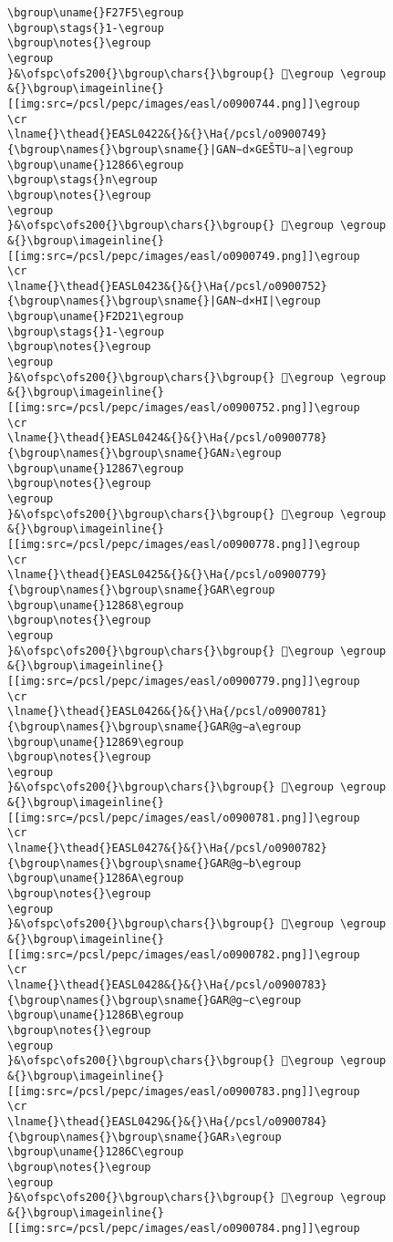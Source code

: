 \begin{verbatim}
\bgroup\uname{}F27F5\egroup
\bgroup\stags{}1-\egroup
\bgroup\notes{}\egroup
\egroup
}&\ofspc\ofs200{}\bgroup\chars{}\bgroup{} 󲟵\egroup \egroup
&{}\bgroup\imageinline{}[[img:src=/pcsl/pepc/images/easl/o0900744.png]]\egroup
\cr
\lname{}\thead{}EASL0422&{}&{}\Ha{/pcsl/o0900749}{\bgroup\names{}\bgroup\sname{}|GAN∼d×GEŠTU∼a|\egroup
\bgroup\uname{}12866\egroup
\bgroup\stags{}n\egroup
\bgroup\notes{}\egroup
\egroup
}&\ofspc\ofs200{}\bgroup\chars{}\bgroup{} 𒡦\egroup \egroup
&{}\bgroup\imageinline{}[[img:src=/pcsl/pepc/images/easl/o0900749.png]]\egroup
\cr
\lname{}\thead{}EASL0423&{}&{}\Ha{/pcsl/o0900752}{\bgroup\names{}\bgroup\sname{}|GAN∼d×HI|\egroup
\bgroup\uname{}F2D21\egroup
\bgroup\stags{}1-\egroup
\bgroup\notes{}\egroup
\egroup
}&\ofspc\ofs200{}\bgroup\chars{}\bgroup{} 󲴡\egroup \egroup
&{}\bgroup\imageinline{}[[img:src=/pcsl/pepc/images/easl/o0900752.png]]\egroup
\cr
\lname{}\thead{}EASL0424&{}&{}\Ha{/pcsl/o0900778}{\bgroup\names{}\bgroup\sname{}GAN₂\egroup
\bgroup\uname{}12867\egroup
\bgroup\notes{}\egroup
\egroup
}&\ofspc\ofs200{}\bgroup\chars{}\bgroup{} 𒡧\egroup \egroup
&{}\bgroup\imageinline{}[[img:src=/pcsl/pepc/images/easl/o0900778.png]]\egroup
\cr
\lname{}\thead{}EASL0425&{}&{}\Ha{/pcsl/o0900779}{\bgroup\names{}\bgroup\sname{}GAR\egroup
\bgroup\uname{}12868\egroup
\bgroup\notes{}\egroup
\egroup
}&\ofspc\ofs200{}\bgroup\chars{}\bgroup{} 𒡨\egroup \egroup
&{}\bgroup\imageinline{}[[img:src=/pcsl/pepc/images/easl/o0900779.png]]\egroup
\cr
\lname{}\thead{}EASL0426&{}&{}\Ha{/pcsl/o0900781}{\bgroup\names{}\bgroup\sname{}GAR@g∼a\egroup
\bgroup\uname{}12869\egroup
\bgroup\notes{}\egroup
\egroup
}&\ofspc\ofs200{}\bgroup\chars{}\bgroup{} 𒡩\egroup \egroup
&{}\bgroup\imageinline{}[[img:src=/pcsl/pepc/images/easl/o0900781.png]]\egroup
\cr
\lname{}\thead{}EASL0427&{}&{}\Ha{/pcsl/o0900782}{\bgroup\names{}\bgroup\sname{}GAR@g∼b\egroup
\bgroup\uname{}1286A\egroup
\bgroup\notes{}\egroup
\egroup
}&\ofspc\ofs200{}\bgroup\chars{}\bgroup{} 𒡪\egroup \egroup
&{}\bgroup\imageinline{}[[img:src=/pcsl/pepc/images/easl/o0900782.png]]\egroup
\cr
\lname{}\thead{}EASL0428&{}&{}\Ha{/pcsl/o0900783}{\bgroup\names{}\bgroup\sname{}GAR@g∼c\egroup
\bgroup\uname{}1286B\egroup
\bgroup\notes{}\egroup
\egroup
}&\ofspc\ofs200{}\bgroup\chars{}\bgroup{} 𒡫\egroup \egroup
&{}\bgroup\imageinline{}[[img:src=/pcsl/pepc/images/easl/o0900783.png]]\egroup
\cr
\lname{}\thead{}EASL0429&{}&{}\Ha{/pcsl/o0900784}{\bgroup\names{}\bgroup\sname{}GAR₃\egroup
\bgroup\uname{}1286C\egroup
\bgroup\notes{}\egroup
\egroup
}&\ofspc\ofs200{}\bgroup\chars{}\bgroup{} 𒡬\egroup \egroup
&{}\bgroup\imageinline{}[[img:src=/pcsl/pepc/images/easl/o0900784.png]]\egroup

\end{verbatim}
